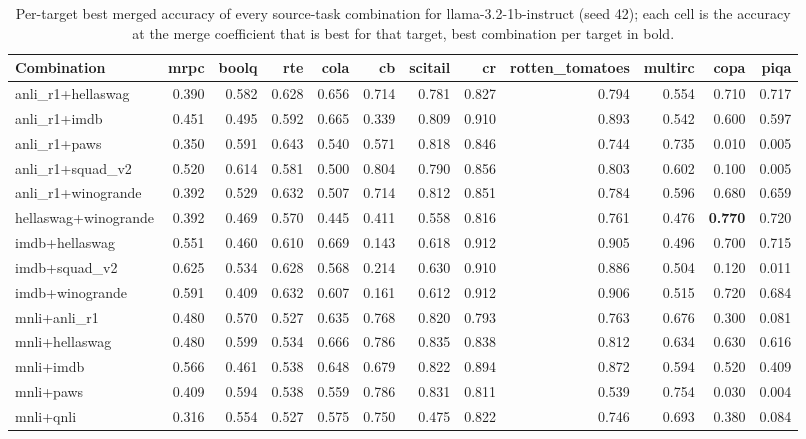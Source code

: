 \begin{table}[t]
  \centering
  \caption{Per-target best merged accuracy of every source-task combination for llama-3.2-1b-instruct (seed 42); each cell is the accuracy at the merge coefficient that is best for that target, best combination per target in bold.}
  \label{tab:target-transfer-full}
  \begin{tabular}{lrrrrrrrrrrr}
    \toprule
    Combination & mrpc & boolq & rte & cola & cb & scitail & cr & rotten\_tomatoes & multirc & copa & piqa \\
    \midrule
    anli\_r1+hellaswag & 0.390 & 0.582 & 0.628 & 0.656 & 0.714 & 0.781 & 0.827 & 0.794 & 0.554 & 0.710 & 0.717 \\
    anli\_r1+imdb & 0.451 & 0.495 & 0.592 & 0.665 & 0.339 & 0.809 & 0.910 & 0.893 & 0.542 & 0.600 & 0.597 \\
    anli\_r1+paws & 0.350 & 0.591 & 0.643 & 0.540 & 0.571 & 0.818 & 0.846 & 0.744 & 0.735 & 0.010 & 0.005 \\
    anli\_r1+squad\_v2 & 0.520 & 0.614 & 0.581 & 0.500 & 0.804 & 0.790 & 0.856 & 0.803 & 0.602 & 0.100 & 0.005 \\
    anli\_r1+winogrande & 0.392 & 0.529 & 0.632 & 0.507 & 0.714 & 0.812 & 0.851 & 0.784 & 0.596 & 0.680 & 0.659 \\
    hellaswag+winogrande & 0.392 & 0.469 & 0.570 & 0.445 & 0.411 & 0.558 & 0.816 & 0.761 & 0.476 & \textbf{0.770} & 0.720 \\
    imdb+hellaswag & 0.551 & 0.460 & 0.610 & 0.669 & 0.143 & 0.618 & 0.912 & 0.905 & 0.496 & 0.700 & 0.715 \\
    imdb+squad\_v2 & 0.625 & 0.534 & 0.628 & 0.568 & 0.214 & 0.630 & 0.910 & 0.886 & 0.504 & 0.120 & 0.011 \\
    imdb+winogrande & 0.591 & 0.409 & 0.632 & 0.607 & 0.161 & 0.612 & 0.912 & 0.906 & 0.515 & 0.720 & 0.684 \\
    mnli+anli\_r1 & 0.480 & 0.570 & 0.527 & 0.635 & 0.768 & 0.820 & 0.793 & 0.763 & 0.676 & 0.300 & 0.081 \\
    mnli+hellaswag & 0.480 & 0.599 & 0.534 & 0.666 & 0.786 & 0.835 & 0.838 & 0.812 & 0.634 & 0.630 & 0.616 \\
    mnli+imdb & 0.566 & 0.461 & 0.538 & 0.648 & 0.679 & 0.822 & 0.894 & 0.872 & 0.594 & 0.520 & 0.409 \\
    mnli+paws & 0.409 & 0.594 & 0.538 & 0.559 & 0.786 & 0.831 & 0.811 & 0.539 & 0.754 & 0.030 & 0.004 \\
    mnli+qnli & 0.316 & 0.554 & 0.527 & 0.575 & 0.750 & 0.475 & 0.822 & 0.746 & 0.693 & 0.380 & 0.084 \\

\end{tabular}
\end{table}
